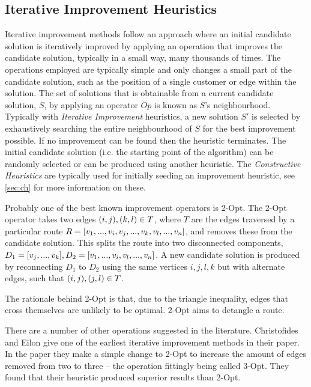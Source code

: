 \subsection{Iterative Improvement Heuristics}

Iterative improvement methods follow an approach where an initial candidate solution is iteratively improved by applying an operation that improves the candidate solution, typically in a small way, many thousands of times. The operations employed are typically simple and only changes a small part of the candidate solution, such as the position of a single customer or edge within the solution. The set of solutions that is obtainable from a current candidate solution, $S$, by applying an operator $Op$ is known as $S$'s neighbourhood. Typically with \emph{Iterative Improvement} heuristics, a new solution $S'$ is selected by exhaustively searching the entire neighbourhood of $S$ for the best improvement possible. If no improvement can be found then the heuristic terminates. The initial candidate solution (i.e. the starting point of the algorithm) can be randomly selected or can be produced using another heuristic. The \emph{Constructive Heuristics} are typically used for initially seeding an improvement heuristic, see \ref{sec:ch} for more information on these.
 
Probably one of the best known improvement operators is 2-Opt. The 2-Opt operator takes two edges $(i,j), (k,l) \in T$, where $T$ are the edges traversed by a particular route $R = [v_1, ..., v_i, v_j, ..., v_k, v_l, ..., v_n]$, and removes these from the candidate solution. This splits the route into two disconnected components, $D_1 = [v_j, ..., v_k], D_2 = [v_1, ..., v_i,v_l, ..., v_n]$. A new candidate solution is produced by reconnecting $D_1$ to $D_2$ using the same vertices $i,j,l,k$ but with alternate edges, such that $(i,j), (j,l) \in T$.


The rationale behind 2-Opt is that, due to the triangle inequality, edges that cross themselves are unlikely to be optimal. 2-Opt aims to detangle a route.

There are a number of other operations suggested in the literature. Christofides and Eilon give one of the earliest iterative improvement methods in their paper\cite{CE:1969}. In the paper they make a simple change to 2-Opt to increase the amount of edges removed from two to three -- the operation fittingly being called 3-Opt. They found that their heuristic produced superior results than 2-Opt.

